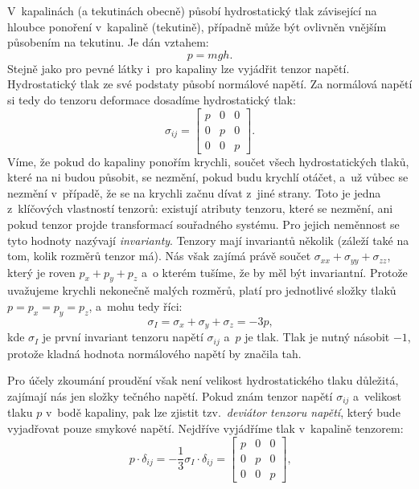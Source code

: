 \documentclass[12pt]{article}
\begin{document}
V~kapalinách (a tekutinách obecně) působí hydrostatický tlak závisející na hloubce ponoření v~kapalině (tekutině), případně může být ovlivněn vnějším působením na tekutinu. Je dán vztahem:
\begin{equation}
    p = mgh\text{.}
\end{equation}
Stejně jako pro pevné látky i~pro kapaliny lze vyjádřit tenzor napětí. Hydrostatický tlak ze své podstaty působí normálové napětí. Za normálová napětí si tedy do tenzoru deformace dosadíme hydrostatický tlak:
\begin{equation}
    \sigma_{ij} = 
    \begin{bmatrix}
        p & 0 & 0\\
        0 & p & 0\\
        0 & 0 & p
    \end{bmatrix}
    \text{.}
\end{equation}
Víme, že pokud do kapaliny ponořím krychli, součet všech hydrostatických tlaků, které na ni budou působit, se nezmění, pokud budu krychlí otáčet, a~už vůbec se nezmění v~případě, že se na krychli začnu dívat z~jiné strany. Toto je jedna z~klíčových vlastností tenzorů: existují atributy tenzoru, které se nezmění, ani pokud tenzor projde transformací souřadného systému. Pro jejich neměnnost se tyto hodnoty nazývají \emph{invarianty}. Tenzory mají invariantů několik (záleží také na tom, kolik rozměrů tenzor má). Nás však zajímá právě součet $\sigma_{xx} + \sigma_{yy} + \sigma_{zz}$, který je roven $p_x + p_y + p_z$ a~o kterém tušíme, že by měl být invariantní. Protože uvažujeme krychli nekonečně malých rozměrů, platí pro jednotlivé složky tlaků $p = p_x = p_y = p_z$, a~mohu tedy říci:
\begin{equation}
    \sigma_I = \sigma_x + \sigma_y + \sigma_z = -3p\text{,}
\end{equation}
kde $\sigma_I$ je první invariant tenzoru napětí $\sigma_{ij}$ a~$p$ je tlak. Tlak je nutný násobit $-1$, protože kladná hodnota normálového napětí by značila tah.
\par \noindent
Pro účely zkoumání proudění však není velikost hydrostatického tlaku důležitá, zajímají nás jen složky tečného napětí. Pokud znám tenzor napětí $\sigma_{ij}$ a~velikost tlaku $p$ v~bodě kapaliny, pak lze zjistit tzv.~\emph{deviátor tenzoru napětí}, který bude vyjadřovat pouze smykové napětí. Nejdříve vyjádříme tlak v~kapalině tenzorem:
\begin{equation}
    p\cdot\delta_{ij} = -\frac{1}{3}\sigma_I\cdot\delta_{ij} =
    \begin{bmatrix}
        p & 0 & 0\\
        0 & p & 0\\
        0 & 0 & p
    \end{bmatrix}
    \text{,}
\end{equation}
\end{document}
